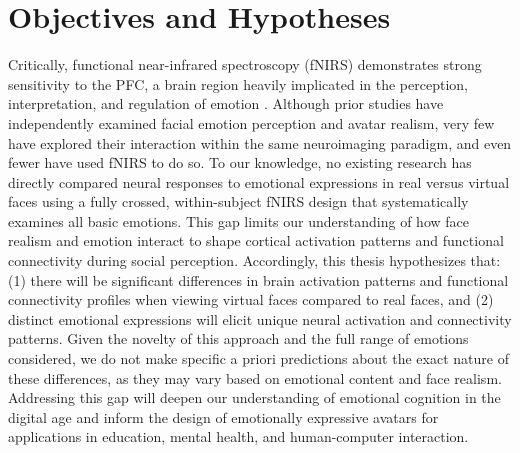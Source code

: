 \section{Objectives and Hypotheses}
Critically, functional near-infrared spectroscopy (fNIRS) demonstrates strong sensitivity to the PFC, a brain region heavily implicated in the perception, interpretation, and regulation of emotion \citep{westgarth_systematic_2021, bendall_brief_2016}. 
Although prior studies have independently examined facial emotion perception and avatar realism, very few have explored their interaction within the same neuroimaging paradigm, and even fewer have used fNIRS to do so. 
To our knowledge, no existing research has directly compared neural responses to emotional expressions in real versus virtual faces using a fully crossed, within-subject fNIRS design that systematically examines all basic emotions. 
This gap limits our understanding of how face realism and emotion interact to shape cortical activation patterns and functional connectivity during social perception.
Accordingly, this thesis hypothesizes that: (1) there will be significant differences in brain activation patterns and functional connectivity profiles when viewing virtual faces compared to real faces, and (2) distinct emotional expressions will elicit unique neural activation and connectivity patterns. 
Given the novelty of this approach and the full range of emotions considered, we do not make specific a priori predictions about the exact nature of these differences, as they may vary based on emotional content and face realism. 
Addressing this gap will deepen our understanding of emotional cognition in the digital age and inform the design of emotionally expressive avatars for applications in education, mental health, and human-computer interaction.